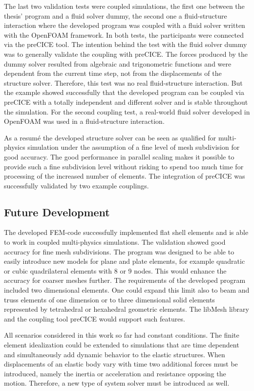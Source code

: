   The last two validation tests were coupled simulations, the first one between the thesis' program and a fluid solver dummy, the second one a fluid-structure interaction where the developed program was coupled with a fluid solver written with the OpenFOAM framework. In both tests, the participants were connected via the preCICE tool. The intention behind the test with the fluid solver dummy was to generally validate the coupling with preCICE. The forces produced by the dummy solver resulted from algebraic and trigonometric functions and were dependent from the current time step, not from the displacements of the structure solver. Therefore, this test was no real fluid-structure interaction. But the example showed successfully that the developed program can be coupled via preCICE with a totally independent and different solver and is stable throughout the simulation. For the second coupling test, a real-world fluid solver developed in OpenFOAM was used in a fluid-structure interaction. %
 
  As a resum\'{e} the developed structure solver can be seen as qualified for multi-physics simulation under the assumption of a fine level of mesh subdivision for good accuracy. The good performance in parallel scaling makes it possible to provide such a fine subdivision level without risking to spend too much time for processing of the increased number of elements. The integration of preCICE was successfully validated by two example couplings. %

 \subsection{Future Development}
  The developed FEM-code successfully implemented flat shell elements and is able to work in coupled multi-physics simulations. The validation showed good accuracy for fine mesh subdivisions. The program was designed to be able to easily introduce new models for plane and plate elements, for example quadratic or cubic quadrilateral elements with 8 or 9 nodes. This would enhance the accuracy for coarser meshes further. The requirements of the developed program included two dimensional elements. One could expand this limit also to beam and truss elements of one dimension or to three dimensional solid elements represented by tetrahedral or hexahedral geometric elements. The libMesh library and the coupling tool preCICE would support such features.
  
  All scenarios considered in this work so far had constant conditions. The finite element idealization could be extended to simulations that are time dependent and simultaneously add dynamic behavior to the elastic structures. When displacements of an elastic body vary with time two additional forces must be introduced, namely the inertia or acceleration and resistance opposing the motion. Therefore, a new type of system solver must be introduced as well.